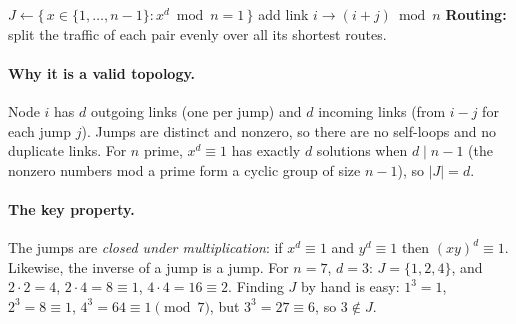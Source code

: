 \documentclass[11pt]{article}
\theoremstyle{definition}
\begin{document}
\begin{algorithm}[H]
\caption{\textsc{BuildTopology}$(n,d)$, for $n$ prime and $d \mid n-1$}
\begin{algorithmic}[1]
\State $J \gets \{\, x \in \{1,\dots,n-1\} : x^d \bmod n = 1 \,\}$ 
    \State add link $i \to (i+j) \bmod n$ 
  \EndFor
\EndFor
\State \textbf{Routing:} split the traffic of each pair evenly over all its shortest routes.
\end{algorithmic}
\end{algorithm}

\paragraph{Why it is a valid topology.} Node $i$ has $d$ outgoing links (one per jump) and $d$ incoming links (from
$i-j$ for each jump $j$). Jumps are distinct and nonzero, so there are no self-loops and no duplicate links. For $n$
prime, $x^d \equiv 1$ has exactly $d$ solutions when $d \mid n-1$ (the nonzero numbers mod a prime form a cyclic group
of size $n-1$), so $|J| = d$.

\paragraph{The key property.} The jumps are \emph{closed under multiplication}: if $x^d \equiv 1$ and $y^d \equiv 1$ then
$(xy)^d \equiv 1$. Likewise, the inverse of a jump is a jump. For $n=7$, $d=3$: $J=\{1,2,4\}$, and
$2\cdot 2=4$, $2\cdot4=8\equiv1$, $4\cdot4=16\equiv2$. Finding $J$ by hand is easy: $1^3=1$, $2^3=8\equiv1$,
$4^3=64\equiv1 \pmod 7$, but $3^3 = 27 \equiv 6$, so $3 \notin J$.
\end{document}
